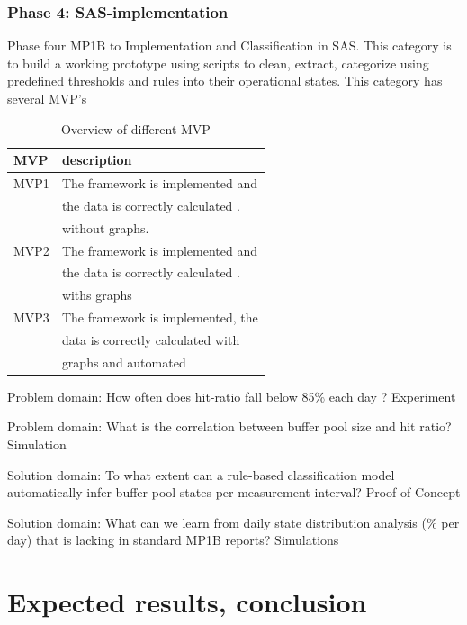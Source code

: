 \subsubsection{Phase 4: SAS-implementation}
Phase four  MP1B to Implementation and Classification in SAS. This category is to build a working prototype using scripts to clean, extract, categorize using predefined thresholds and rules into their operational states. This category has several MVP's

\begin{table}[h]
    \centering
    \renewcommand{\arraystretch}{1.3}
    \begin{tabular}{|l|l|}
        \hline
        \textbf{MVP} & \textbf{description} \\
        \hline
        MVP1 & The framework is implemented and    \\
             & the data is correctly calculated .          \\
             & without graphs.  \\
        MVP2 & The framework is implemented and    \\
             & the data is correctly calculated .            \\
             & withs graphs \\
        MVP3 & The framework is implemented, the    \\
             & data is correctly calculated with               \\
             & graphs and automated              \\
        \hline
    \end{tabular}
    \caption{Overview of different MVP}
\end{table}


Problem domain: How often does hit-ratio fall below 85\% each day ?
Experiment

Problem domain: What is the correlation between buffer pool size and hit ratio?
Simulation

Solution domain: To what extent can a rule-based classification model automatically infer buffer pool states per measurement interval?
Proof-of-Concept

Solution domain: What can we learn from daily state distribution analysis (\% per day) that is lacking in standard MP1B reports?
Simulations


\section{Expected results, conclusion}%
\label{sec:verwachte_resultaten}

